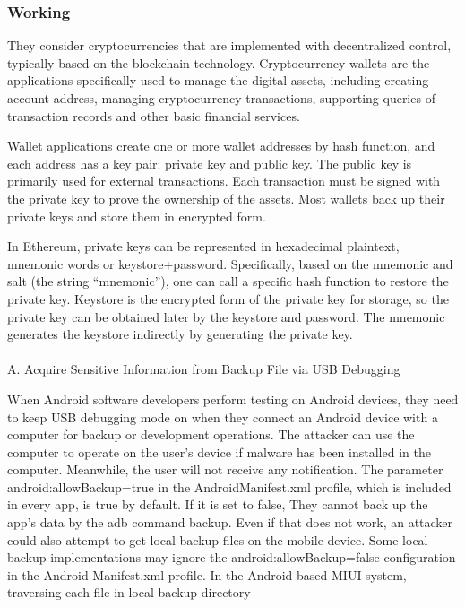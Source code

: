 \documentclass[12pt]{article}
\begin{document}
\newpage
\subsubsection{Working}

\par They consider cryptocurrencies that are implemented with decentralized control, typically based on
the blockchain technology. Cryptocurrency wallets are the
applications specifically used to manage the digital assets,
including creating account address, managing cryptocurrency
transactions, supporting queries of transaction records and
other basic financial services.\par
Wallet applications create one or more wallet addresses
by hash function, and each address has a key pair: private
key and public key. The public key is primarily used for
external transactions. Each transaction must be signed with
the private key to prove the ownership of the assets. Most
wallets back up their private keys and store them in encrypted
form. \par In Ethereum, private keys can be represented in hexadecimal plaintext, mnemonic words or keystore+password.
Specifically, based on the mnemonic and salt (the string
“mnemonic”), one can call a specific hash function to restore
the private key. Keystore is the encrypted form of the private
key for storage, so the private key can be obtained later by the
keystore and password. The mnemonic generates the keystore
indirectly by generating the private key.
\\
\\
A. Acquire Sensitive Information from Backup File via USB
Debugging 
\par
When Android software developers perform testing on
Android devices, they need to keep USB debugging mode on
when they connect an Android device with a computer for
backup or development operations. The attacker can use the
computer to operate on the user’s device if malware has been
installed in the computer. Meanwhile, the user will not receive
any notification. The parameter android:allowBackup=true in
the AndroidManifest.xml profile, which is included in every
app, is true by default. If it is set to false, They cannot back up
the app’s data by the adb command backup. Even if that does
not work, an attacker could also attempt to get local backup
files on the mobile device. Some local backup implementations may ignore the android:allowBackup=false configuration in the Android Manifest.xml profile. In the Android-based
MIUI system, traversing each file in local backup directory
\end{document}
